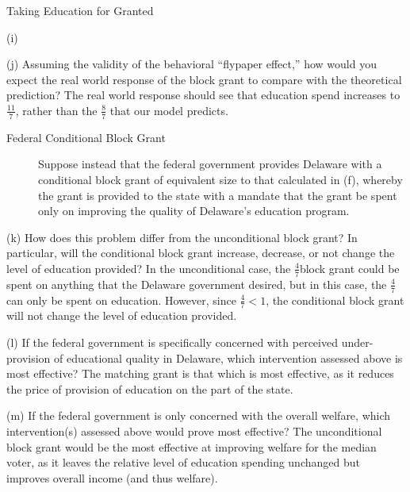 \documentclass[8pt]{extarticle}
\begin{document}
\begin{problem}{Taking Education for Granted}
\begin{problem}{(i)}
    \end{problem}
    \begin{problem}{(j)}
      Assuming the validity of the behavioral ``flypaper effect,'' how would you expect the real world response of the block grant to compare with the theoretical prediction?
      \tcblower
      The real world response should see that education spend increases to $\frac{11}{7}$, rather than the $\frac{8}{7}$ that our model predicts.
    \end{problem}
    \begin{description}
      \item[Federal Conditional Block Grant] Suppose instead that the federal government provides Delaware with a conditional block grant of equivalent size to that calculated in (f), whereby the grant is provided to the state with a mandate that the grant be spent only on improving the quality of Delaware's education program.
    \end{description}
    \begin{problem}{(k)}
      How does this problem differ from the unconditional block grant? In particular, will the conditional block grant increase, decrease, or not change the level of education provided?
      \tcblower
      In the unconditional case, the $\frac{4}{7} $block grant could be spent on anything that the Delaware government desired, but in this case, the $\frac{4}{7}$ can only be spent on education. However, since $\frac{4}{7} < 1$, the conditional block grant will not change the level of education provided.
    \end{problem}
    \begin{problem}{(l)}
      If the federal government is specifically concerned with perceived under-provision of educational quality in Delaware, which intervention assessed above is most effective?
      \tcblower
      The matching grant is that which is most effective, as it reduces the price of provision of education on the part of the state.
    \end{problem}
    \begin{problem}{(m)}
      If the federal government is only concerned with the overall welfare, which intervention(s) assessed above would prove most effective?
      \tcblower
      The unconditional block grant would be the most effective at improving welfare for the median voter, as it leaves the relative level of education spending unchanged but improves overall income (and thus welfare).
    \end{problem}
  \end{problem}
\end{document}
